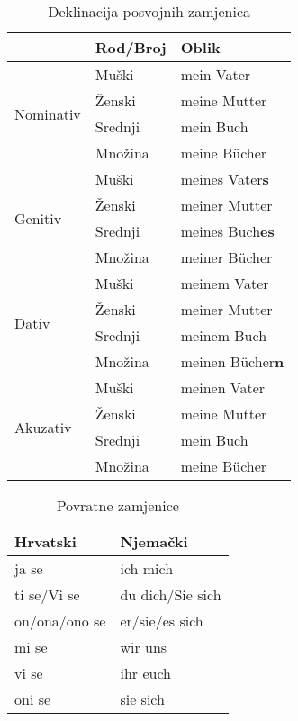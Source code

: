 \documentclass[12pt,german]{article}
\begin{document}
\begin{multicols}{2}
\begin{table}[H]
\caption{Deklinacija posvojnih zamjenica}
\begin{tabular}{@{} lll @{}}
\toprule
  & Rod/Broj & Oblik \\
  \midrule
  \multirow{4}{3mm}{\begin{sideways}\parbox{20mm}{Nominativ}\end{sideways}}
  & Muški & mein Vater \\
  & Ženski & meine Mutter \\
  & Srednji & mein Buch \\
  & Množina & meine B\"ucher \\
  \midrule
  \multirow{4}{3mm}{\begin{sideways}\parbox{15mm}{Genitiv}\end{sideways}}
  & Muški & meines Vater\bf{s} \\
  & Ženski & meiner Mutter \\
  & Srednji & meines Buch\bf{es} \\
  & Množina & meiner B\"ucher \\
  \midrule
  \multirow{4}{3mm}{\begin{sideways}\parbox{12mm}{Dativ}\end{sideways}}
  & Muški & meinem Vater \\
  & Ženski & meiner Mutter \\
  & Srednji & meinem Buch \\
  & Množina & meinen B\"ucher\bf{n} \\
  \midrule
  \multirow{4}{3mm}{\begin{sideways}\parbox{18mm}{Akuzativ}\end{sideways}}
  & Muški & meinen Vater \\
  & Ženski & meine Mutter \\
  & Srednji & mein Buch \\
  & Množina & meine B\"ucher \\
  \bottomrule
\end{tabular}
\end{table}

\begin{table}[H]
\caption{Povratne zamjenice}
\begin{tabular}{@{} ll @{}}
\toprule
Hrvatski  &  Njemački \\
\midrule
ja se & ich mich \\
ti se/Vi se & du dich/Sie sich \\
on/ona/ono se & er/sie/es sich \\
mi se & wir uns \\
vi se & ihr euch \\
oni se & sie sich \\
\bottomrule
\end{tabular}
\end{table}


\end{multicols}
\end{document}
